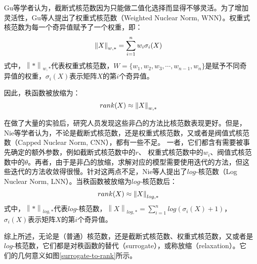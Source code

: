 \documentclass[12pt, a4paper]{article}
\begin{document}
\par Gu等学者认为，截断式核范数因为只能做二值化选择而显得不够灵活\cite{WNN-1}。为了增加灵活性，Gu等人提出了权重式核范数（Weighted Nuclear Norm, WNN）。权重式核范数为每一个奇异值赋予了一个权重，即：
\begin{displaymath}
\centering
\left\|X\right\|_{w,*} = \sum\limits_{i=1}^{n}w_i\sigma_i(X)
\end{displaymath}
式中，$\left\|*\right\|_{w,*}$代表权重式核范数，$W=\{w_1, w_2, w_3, \cdots, w_{n-1}, w_{n}\}$是赋予不同奇异值的权重，$\sigma_i(X)$表示矩阵$X$的第$i$个奇异值。
\par 因此，秩函数被放缩为：
\begin{equation}
\centering
rank(X) \approx \left\|X\right\|_{w,*}
\label{WNN-equation}
\end{equation}
\par 在做了大量的实验后，研究人员发现这些非凸的方法比核范数表现更好。但是，Nie等学者认为，不论是截断式核范数，还是权重式核范数，又或者是阀值式核范数（Capped Nuclear Norm, CNN）\cite{CNN-1}\cite{CNN-2}，都有一些不足\cite{log-norm}。 一者，它们都含有需要被事先确定的额外参数，例如截断式核范数中的$r$、 权重式核范数中的$w_i$、阀值式核范数中的$\theta$。再者，由于是非凸的放缩，求解对应的模型需要使用迭代的方法，但这些迭代的方法收敛得很慢。针对这两点不足，Nie等人提出了$log$-核范数（Log Nuclear Norm, LNN）。当秩函数被放缩为$log$-核范数后：
\begin{equation}
\centering
rank(X) \approx \left\|X\right\|_{log,*}
\label{log-equation}
\end{equation}
式中，$\left\|*\right\|_{log,*}$代表$log$-核范数，$\left\|X\right\|_{log,*} = \sum\limits_{i=1}^{n}log(\sigma_i(X)+1)$，$\sigma_i(X)$表示矩阵$X$的第$i$个奇异值。
\par 综上所述，无论是（普通）核范数，还是截断式核范数、权重式核范数，又或者是$log$-核范数，它们都是对秩函数的替代（surrogate），或称放缩（relaxation）。它们的几何意义如图\ref{surrogate-to-rank}所示。
\end{document}
